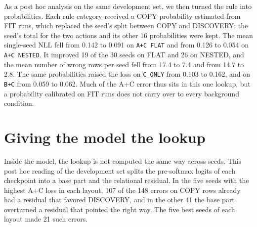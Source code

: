 As a post hoc analysis on the same development set, we then turned the
rule into probabilities. Each rule category
received a COPY probability estimated from FIT runs, which replaced the
seed's split between COPY and DISCOVERY; the seed's total for the two
actions and its other 16 probabilities were kept. The mean single-seed
NLL fell from 0.142 to 0.091 on \texttt{A+C FLAT} and from 0.126 to
0.054 on \texttt{A+C NESTED}. It improved 19 of the 30 seeds on FLAT
and 26 on NESTED, and the mean number of wrong rows per seed fell from
17.4 to 7.4 and from 14.7 to 2.8. The same probabilities raised the loss
on \texttt{C\_ONLY} from 0.103 to 0.162, and on \texttt{B+C} from 0.059
to 0.062. Much of the A+C error thus sits in this one lookup, but a
probability calibrated on FIT runs does not carry over to every
background condition.

\section{Giving the model the lookup}
\label{sec:diag-intervention}

Inside the model, the lookup is not computed the same way across seeds.
This post hoc reading of the development set splits the pre-softmax
logits of each checkpoint into a base part and the relational residual. In the five seeds with the
highest A+C loss in each layout, 107 of the 148 errors on COPY rows
already had a residual that favored DISCOVERY, and in the other 41 the
base part overturned a residual that pointed the right way. The five
best seeds of each layout made 21 such errors.

